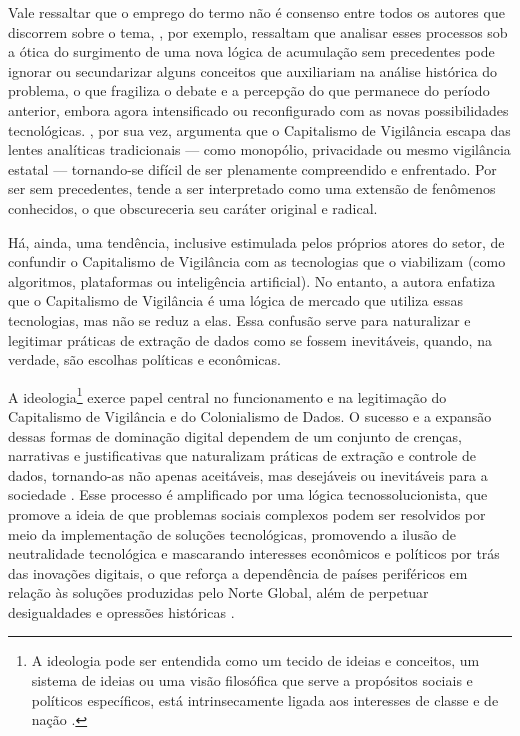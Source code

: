 Vale ressaltar que o emprego do termo não é consenso entre todos os autores que discorrem sobre o tema, , por exemplo, ressaltam que analisar esses processos sob a ótica do surgimento de uma nova lógica de acumulação sem precedentes pode ignorar ou secundarizar alguns conceitos que auxiliariam na análise histórica do problema, o que fragiliza o debate e a percepção do que permanece do período anterior, embora agora intensificado ou reconfigurado com as novas possibilidades tecnológicas. , por sua vez, argumenta que o Capitalismo de Vigilância escapa das lentes analíticas tradicionais — como monopólio, privacidade ou mesmo vigilância estatal — tornando-se difícil de ser plenamente compreendido e enfrentado. Por ser sem precedentes, tende a ser interpretado como uma extensão de fenômenos conhecidos, o que obscureceria seu caráter original e radical.

Há, ainda, uma tendência, inclusive estimulada pelos próprios atores do setor, de confundir o Capitalismo de Vigilância com as tecnologias que o viabilizam (como algoritmos, plataformas ou inteligência artificial). No entanto, a autora enfatiza que o Capitalismo de Vigilância é uma lógica de mercado que utiliza essas tecnologias, mas não se reduz a elas. Essa confusão serve para naturalizar e legitimar práticas de extração de dados como se fossem inevitáveis, quando, na verdade, são escolhas políticas e econômicas.

A ideologia\footnote{
A ideologia pode ser entendida como um tecido de ideias e conceitos, um sistema de ideias ou uma visão filosófica que serve a propósitos sociais e políticos específicos,  está intrinsecamente ligada aos interesses de classe e de nação \cite{vieirapinto1963}.
} exerce papel central no funcionamento e na legitimação do Capitalismo de Vigilância e do Colonialismo de Dados. O sucesso e a expansão dessas formas de dominação digital dependem de um conjunto de crenças, narrativas e justificativas que naturalizam práticas de extração e controle de dados, tornando-as não apenas aceitáveis, mas desejáveis ou inevitáveis para a sociedade \cite{Zuboff2019}. Esse processo é amplificado por uma lógica tecnossolucionista, que promove a ideia de que problemas sociais complexos podem ser resolvidos por meio da implementação de soluções tecnológicas, promovendo a ilusão de neutralidade tecnológica e mascarando interesses econômicos e políticos por trás das inovações digitais, o que reforça a dependência de países periféricos em relação às soluções produzidas pelo Norte Global, além de perpetuar desigualdades e opressões históricas \cite{Faustino2023}.

